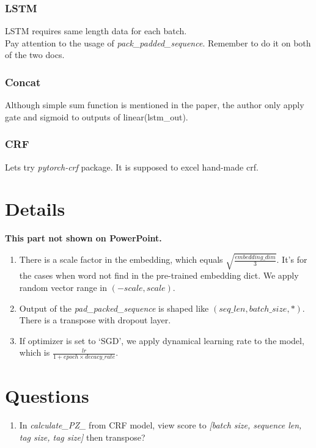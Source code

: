 \documentclass[12pt]{article}
\begin{document}
    \subsubsection{LSTM}\label{lstm}
    LSTM requires same length data for each batch.\\
    Pay attention to the usage of \emph{pack\_padded\_sequence}. Remember to do it on both of the two docs.
    \subsubsection{Concat}\label{concat}
    Although simple sum function is mentioned in the paper, the author only apply gate and sigmoid to
    outputs of linear(lstm\_out).
    \subsubsection{CRF}\label{crf}
    Lets try \emph{pytorch-crf} package. It is supposed to excel hand-made crf.
    \section{Details}
    \textbf{This part not shown on PowerPoint.}
    \begin{enumerate}
        \item There is a scale factor in the embedding, which equals $\sqrt{\frac{embedding\_dim}{3}}$.
        It's for the cases when word not find in the pre-trained embedding dict. We apply random vector range in $(-scale, scale)$.
        \item Output of the \emph{pad\_packed\_sequence} is shaped like $(seq\_len, batch\_size, *)$.
        There is a transpose with dropout layer.
        \item If optimizer is set to `SGD', we apply dynamical learning rate to the model, which is $\frac{lr}{1 + epoch \times decacy\_rate}$.
    \end{enumerate}
    \section{Questions}
    \begin{enumerate}
        \item In \emph{calculate\_PZ\_} from CRF model, view score to \emph{[batch size, sequence len, tag size, tag size]} then transpose? 
    \end{enumerate}
\end{document}
